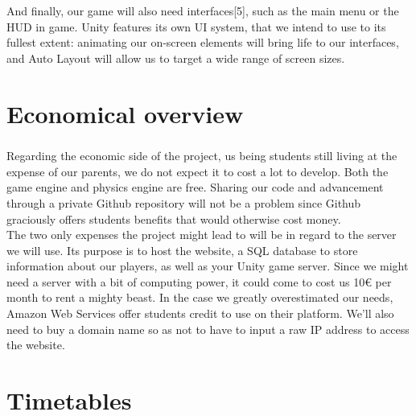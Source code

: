 And finally, our game will also need interfaces[5], such as the main menu or the HUD in game. Unity features its own UI system, that we intend to use to its fullest extent: animating our on-screen elements will bring life to our interfaces, and Auto Layout will allow us to target a wide range of screen sizes.\\

\chapter{Economical overview}

\paragraph{}Regarding the economic side of the project, us being students still living at the expense of our parents, we do not expect it to cost a lot to develop. Both the game engine and physics engine are free. Sharing our code and advancement through a private Github repository will not be a problem since Github graciously offers students benefits that would otherwise cost money.\\

The two only expenses the project might lead to will be in regard to the server we will use. Its purpose is to host the website, a SQL database to store information about our players, as well as your Unity game server. Since we might need a server with a bit of computing power, it could come to cost us 10\euro{} per month to rent a mighty beast. In the case we greatly overestimated our needs, Amazon Web Services offer students credit to use on their platform. We’ll also need to buy a domain name so as not to have to input a raw IP address to access the website.\\

\chapter{Timetables}

